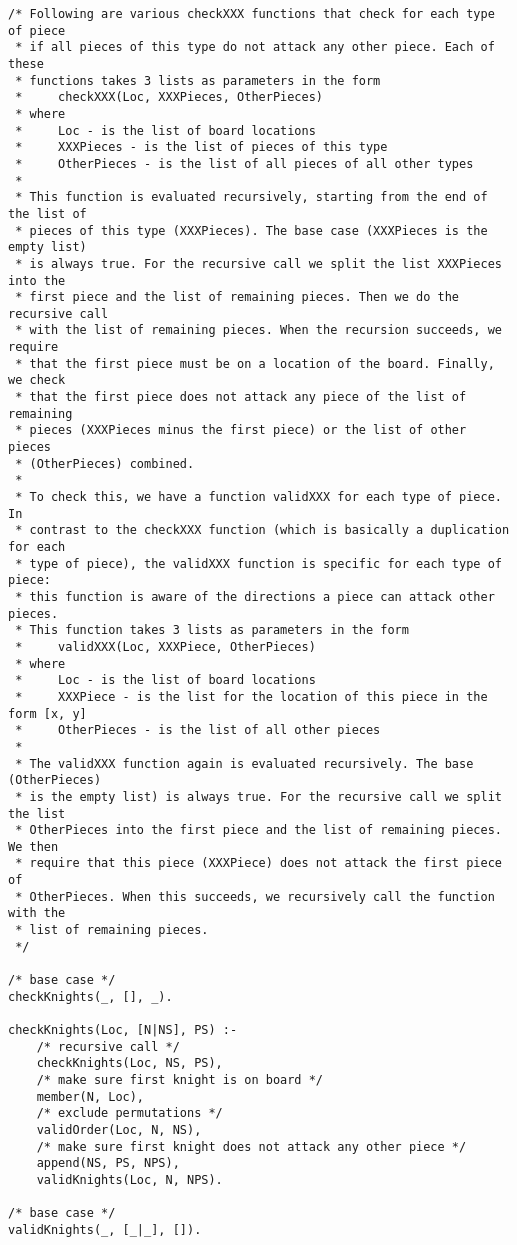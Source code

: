 \documentclass{article}
\begin{document}
\begin{verbatim}
/* Following are various checkXXX functions that check for each type of piece
 * if all pieces of this type do not attack any other piece. Each of these
 * functions takes 3 lists as parameters in the form
 *     checkXXX(Loc, XXXPieces, OtherPieces)
 * where
 *     Loc - is the list of board locations
 *     XXXPieces - is the list of pieces of this type
 *     OtherPieces - is the list of all pieces of all other types
 *
 * This function is evaluated recursively, starting from the end of the list of
 * pieces of this type (XXXPieces). The base case (XXXPieces is the empty list)
 * is always true. For the recursive call we split the list XXXPieces into the
 * first piece and the list of remaining pieces. Then we do the recursive call
 * with the list of remaining pieces. When the recursion succeeds, we require
 * that the first piece must be on a location of the board. Finally, we check
 * that the first piece does not attack any piece of the list of remaining
 * pieces (XXXPieces minus the first piece) or the list of other pieces
 * (OtherPieces) combined.
 *
 * To check this, we have a function validXXX for each type of piece. In
 * contrast to the checkXXX function (which is basically a duplication for each
 * type of piece), the validXXX function is specific for each type of piece:
 * this function is aware of the directions a piece can attack other pieces.
 * This function takes 3 lists as parameters in the form
 *     validXXX(Loc, XXXPiece, OtherPieces)
 * where
 *     Loc - is the list of board locations
 *     XXXPiece - is the list for the location of this piece in the form [x, y]
 *     OtherPieces - is the list of all other pieces
 *
 * The validXXX function again is evaluated recursively. The base (OtherPieces)
 * is the empty list) is always true. For the recursive call we split the list
 * OtherPieces into the first piece and the list of remaining pieces. We then
 * require that this piece (XXXPiece) does not attack the first piece of
 * OtherPieces. When this succeeds, we recursively call the function with the
 * list of remaining pieces.
 */

/* base case */
checkKnights(_, [], _).

checkKnights(Loc, [N|NS], PS) :-
	/* recursive call */
	checkKnights(Loc, NS, PS),
	/* make sure first knight is on board */
	member(N, Loc),
	/* exclude permutations */
	validOrder(Loc, N, NS),
	/* make sure first knight does not attack any other piece */
	append(NS, PS, NPS),
	validKnights(Loc, N, NPS).

/* base case */
validKnights(_, [_|_], []).


\end{verbatim}
\end{document}
